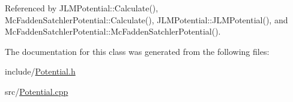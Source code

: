 Referenced by J\-L\-M\-Potential\-::\-Calculate(), Mc\-Fadden\-Satchler\-Potential\-::\-Calculate(), J\-L\-M\-Potential\-::\-J\-L\-M\-Potential(), and Mc\-Fadden\-Satchler\-Potential\-::\-Mc\-Fadden\-Satchler\-Potential().



The documentation for this class was generated from the following files\-:\begin{DoxyCompactItemize}
\item 
include/\hyperlink{Potential_8h}{Potential.\-h}\item 
src/\hyperlink{Potential_8cpp}{Potential.\-cpp}\end{DoxyCompactItemize}

